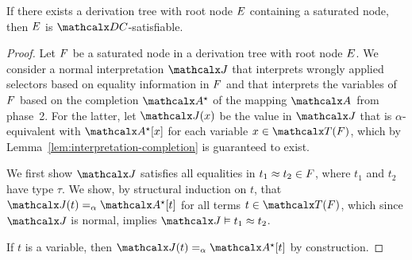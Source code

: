 \begin{theorem}%
\label{thm:ss}%
\afterDot
If there exists a derivation tree with root node $E$ containing a saturated node, then $E$ is $\thD$-satisfiable.
\end{theorem}
\begin{proof}
Let $F$ be a saturated node in a derivation tree with root node $E$.
We consider a normal interpretation $\J$
that interprets wrongly applied selectors based on equality information in $F$
and that interprets the variables of $F$ based on the completion $\ValC$ of the mapping $\Val$ from phase~2.
For the latter, let $\interp{\J}{x}$ be the value in $\J$ that is $\alpha$-equivalent with $\ValC \ec{x}$ for each variable $x \in \Terms(\Fc)$,
which by Lemma~\ref{lem:interpretation-completion} is guaranteed to exist.

We first show $\J$ satisfies all equalities in $t_1 \approx t_2 \in F$, where $t_1$ and $t_2$ have type $\tau$.
We show,
by structural induction on $t$,
that $\interp{\J}{t} \aequiv \ValC \ec{t}$ for all terms $t \in \Terms( \Fc )$,
which since $\J$ is normal, implies $\J \models t_1 \teq t_2$.

If $t$ is a variable, then $\interp{\J}{t} \vsim \ValC \ec{ t }$ by construction.


\end{proof}
